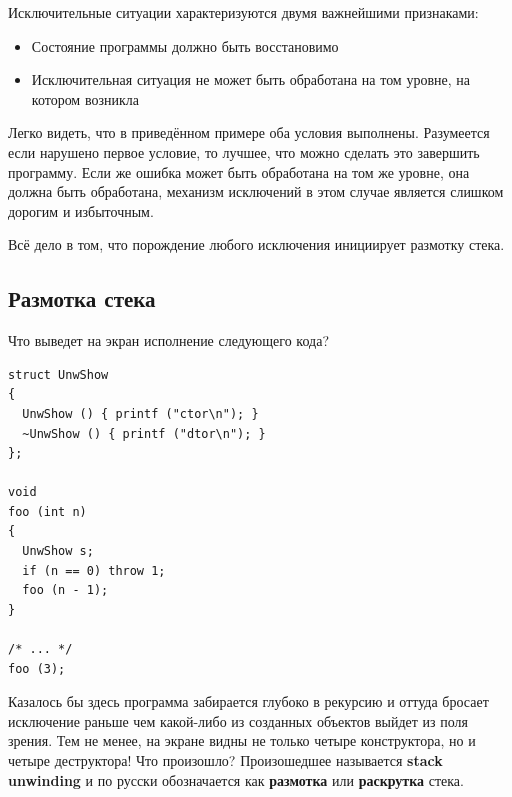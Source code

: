\documentclass[a4paper,12pt,oneside]{book}
\begin{document}
Исключительные ситуации характеризуются двумя важнейшими признаками:
\begin{itemize}
\item Состояние программы должно быть восстановимо
\item Исключительная ситуация не может быть обработана на том уровне, на котором возникла
\end{itemize}

Легко видеть, что в приведённом примере оба условия выполнены. Разумеется если нарушено первое условие, то лучшее, что можно сделать это завершить программу. Если же ошибка может быть обработана на том же уровне, она должна быть обработана, механизм исключений в этом случае является слишком дорогим и избыточным.

Всё дело в том, что порождение любого исключения инициирует размотку стека.

\subsection{Размотка стека}\label{subsub:unwinding}

Что выведет на экран исполнение следующего кода?

\begin{lstlisting}
struct UnwShow
{
  UnwShow () { printf ("ctor\n"); }
  ~UnwShow () { printf ("dtor\n"); }
};

void
foo (int n)
{
  UnwShow s;
  if (n == 0) throw 1;
  foo (n - 1);
}

/* ... */
foo (3);

\end{lstlisting}

Казалось бы здесь программа забирается глубоко в рекурсию и оттуда бросает исключение раньше чем какой-либо из созданных объектов выйдет из поля зрения. Тем не менее, на экране видны не только четыре конструктора, но и четыре деструктора! Что произошло? Произошедшее называется \textbf{stack unwinding} и по русски обозначается как \textbf{размотка} или \textbf{раскрутка} стека.
\end{document}
